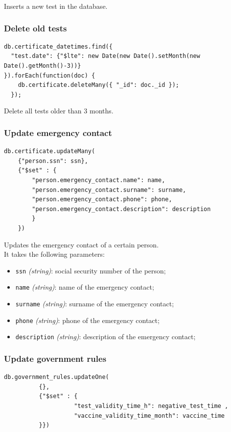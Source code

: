 \documentclass[12pt, a4paper]{article}
\begin{document}
\noindent
Inserts a new test in the database. 

\subsubsection{Delete old tests}
\begin{tcolorbox}[fontupper=\scriptsize]
    \begin{verbatim}
db.certificate_datetimes.find({ 
  "test.date": {"$lte": new Date(new Date().setMonth(new Date().getMonth()-3))}
}).forEach(function(doc) {
    db.certificate.deleteMany({ "_id": doc._id });
  });
      \end{verbatim}
\end{tcolorbox}

\noindent
Delete all tests older than 3 months.

\subsubsection{Update emergency contact}
\begin{tcolorbox}[fontupper=\scriptsize]
    \begin{verbatim}
db.certificate.updateMany(
	{"person.ssn": ssn},
	{"$set" : {
		"person.emergency_contact.name": name,
		"person.emergency_contact.surname": surname,
		"person.emergency_contact.phone": phone,
		"person.emergency_contact.description": description	
		}
	})
      \end{verbatim}
\end{tcolorbox}

\noindent
Updates the emergency contact of a certain person. \\
It takes the following parameters:
\begin{itemize}
    \item \texttt{ssn} \emph{(string)}: social security number of the person;
    \item \texttt{name} \emph{(string)}: name of the emergency contact;
    \item \texttt{surname} \emph{(string)}: surname of the emergency contact;
    \item \texttt{phone} \emph{(string)}: phone of the emergency contact;
    \item \texttt{description} \emph{(string)}: description of the emergency contact;
 \end{itemize}


\subsubsection{Update government rules} 
\begin{tcolorbox}[fontupper=\scriptsize]
    \begin{verbatim}
db.government_rules.updateOne(
          {},
          {"$set" : { 
                    "test_validity_time_h": negative_test_time , 
                    "vaccine_validity_time_month": vaccine_time
          }})
      \end{verbatim}
\end{tcolorbox}
\end{document}
